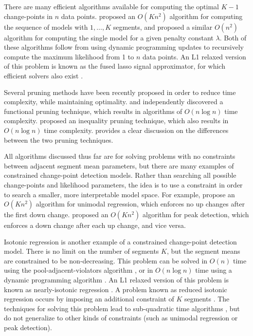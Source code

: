 \documentclass{article}
\begin{document}
There are many efficient algorithms available for computing the
optimal $K-1$ change-points in $n$ data
points. \citet{segment-neighborhood} proposed an $O(K n^2)$ algorithm
for computing the sequence of models with $1,\dots,K$ segments, and
\citet{optimal-partitioning} proposed a similar $O(n^2)$ algorithm for
computing the single model for a given penalty constant
$\lambda$. Both of these algorithms follow from using dynamic
programming updates \citep{bellman} to recursively compute the maximum
likelihood from 1 to $n$ data points. An L1 relaxed version of this
problem is known as the fused lasso signal approximator, for which
efficient solvers also exist \citep{flsa}.

Several pruning methods have been recently proposed in order to reduce
time complexity, while maintaining optimality.  \citet{pruned-dp} and
\citet{phd-johnson} independently discovered a functional pruning
technique, which results in algorithms of $O(n\log n)$ time
complexity. \citet{pelt} proposed an inequality pruning technique,
which also results in $O(n\log n)$ time
complexity. \citet{fpop} provides a clear discussion on the
differences between the two pruning techniques.

All algorithms discussed thus far are for solving problems with no
constraints between adjacent segment mean parameters, but there are
many examples of constrained change-point detection models. Rather
than searching all possible change-points and likelihood parameters,
the idea is to use a constraint in order to search a smaller, more
interpretable model space. For example, \citet{haiminen2008algorithms}
propose an $O(Kn^2)$ algorithm for unimodal regression, which enforces
no up changes after the first down change. \citet{HOCKING-PeakSeg}
proposed an $O(Kn^2)$ algorithm for peak detection, which enforces a
down change after each up change, and vice versa.

Isotonic regression is another example of a constrained change-point
detection model. There is no limit on the number of segments $K$, but
the segment means are constrained to be non-decreasing. This problem
can be solved in $O(n)$ time using the pool-adjacent-violators
algorithm \citep{mair2009isotone}, or in $O(n\log n)$ time using a
dynamic programming algorithm \citep{isotonic-dp}. An L1 relaxed
version of this problem is known as nearly-isotonic regression
\citep{tibshirani2011nearly}. A problem known as reduced isotonic
regression occurs by imposing an additional constraint of $K$ segments
\citep{reduced-monotonic-regression}. The techniques for solving this
problem lead to sub-quadratic time algorithms
\citep{hardwick2014optimal}, but do not generalize to other kinds of
constraints (such as unimodal regression or peak detection).
\end{document}
